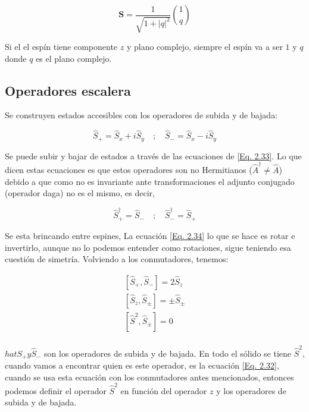 \documentclass[11pt,fleqn]{book}
\renewcommand{\vec}[1]{\mathbf{#1}}
\begin{document}
\begin{equation*}
    \vec{S}=\frac{1}{\sqrt{1+|q|^{2}}}\binom{1}{q}
\end{equation*}

Si el el espín tiene componente $z$ y plano complejo, siempre el espín va a ser $1$ y $q$ donde $q$ es el plano complejo.

\subsection{Operadores escalera}

Se construyen estados accesibles con los operadores de subida y de bajada:

\begin{equation}
    \hat{S}_{+}=\hat{S}_{x}+i\hat{S}_{y}\quad;\quad\hat{S}_{-}=\hat{S}_{x}-i\hat{S}_{y}
    \label{Eq. 2.33}
\end{equation}

Se puede subir y bajar de estados a través de las ecuaciones de \ref{Eq. 2.33}. Lo que dicen estas ecuaciones es que estos operadores son no Hermitianos ($\hat{A}^{\dagger}\neq\hat{A}$) debido a que como no es invariante ante transformaciones el adjunto conjugado (operador daga) no es el mismo, es decir,

\begin{equation}
    \hat{S}_{+}^{\dagger}=\hat{S}_{-}\quad;\quad\hat{S}_{-}^{\dagger}=\hat{S}_{+}
    \label{Eq. 2.34}
\end{equation}

Se esta brincando entre espines, La ecuación \ref{Eq. 2.34} lo que se hace es rotar e invertirlo, aunque no lo podemos entender como rotaciones, sigue teniendo esa cuestión de simetría. 
Volviendo a los conmutadores, tenemos:

\begin{equation*}
    \begin{split}
        \left[\hat{S}_{+},\hat{S}_{-}\right]=2\hat{S}_{z}\\
        \left[\hat{S}_{z},\hat{S}_{\pm}\right]=\pm\hat{S}_{\pm}\\
        \left[\hat{S}^{2},\hat{S}_{\pm}\right]=0\\
    \end{split}
\end{equation*}

$hat{S}_{+} y \hat{S}_{-}$ son los operadores de subida y de bajada. En todo el sólido se tiene $\hat{S}^{2}$, cuando vamos a encontrar quien es este operador, es la ecuación \ref{Eq. 2.32}, cuando se usa esta ecuación con los conmutadores antes mencionados, entonces podemos definir el operador $\hat{S}^{2}$ en función del operador $z$ y los operadores de subida y de bajada.
\end{document}
